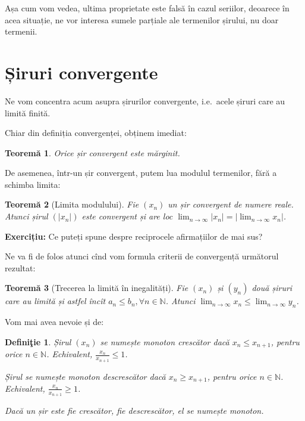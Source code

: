 \documentclass[11pt,a4paper]{article}
\newcommand\ds{\displaystyle}
\newcommand\id{\indent}
\newcommand\NN{\mathbb{N}}
\theoremstyle{dotless}
\newtheorem{theorem}{Teorem\u{a}}[section]
\theoremstyle{dotlessdr}
\newtheorem{definition}{Defini\c{t}ie}[section]
\begin{document}
Așa cum vom vedea, ultima proprietate este falsă în cazul seriilor, deoarece în
acea situație, ne vor interesa sumele parțiale ale termenilor șirului, nu
doar termenii.


\section{Șiruri convergente}

\id\id Ne vom concentra acum asupra șirurilor convergente, i.e.\ acele
șiruri care au limită finită.

Chiar din definiția convergenței, obținem imediat:

\begin{theorem}\label{thm:conv-marg}
  Orice șir convergent este mărginit.
\end{theorem}

De asemenea, într-un șir convergent, putem lua modulul termenilor, fără
a schimba limita:

\begin{theorem}[Limita modulului]\label{thm:lim-modul}
  Fie $(x_n)$ un șir convergent de numere reale. Atunci șirul $(|x_n|)$ este
  convergent și are loc $\ds\lim_{n \to \infty} |x_n| = | \ds\lim_{n \to \infty} x_n |$.
\end{theorem}

\textbf{Exercițiu:} Ce puteți spune despre reciprocele afirmațiilor de mai sus?

Ne va fi de folos atunci cînd vom formula criterii de convergență următorul
rezultat:

\begin{theorem}[Trecerea la limită în inegalități]\label{thm:lim-ineg}
  Fie $(x_n)$ și $(y_n)$ două șiruri care au limită și astfel încît
  $a_n \leq b_n, \forall n \in \NN$. Atunci $\ds\lim_{n \to \infty} x_n \leq %
  \ds\lim_{n \to \infty} y_n$.
\end{theorem}

Vom mai avea nevoie și de:
\begin{definition}\label{def:sir-monoton}
  Șirul $(x_n)$ se numește \emph{monoton crescător} dacă $x_n \leq x_{n + 1}$,
  pentru orice $n \in \NN$. Echivalent, $\frac{x_n}{x_{n+1}} \leq 1$.

  Șirul se numește \emph{monoton descrescător} dacă $x_n \geq x_{n + 1}$, pentru
  orice $n \in \NN$. Echivalent, $\frac{x_n}{x_{n+1}} \geq 1$.

  Dacă un șir este fie crescător, fie descrescător, el se numește \emph{monoton}.
\end{definition}
\end{document}

